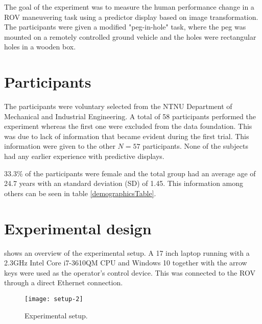 The goal of the experiment was to measure the human performance change in a ROV maneuvering task using a predictor display based on image transformation. The participants were given a modified "peg-in-hole" task, where the peg was mounted on a remotely controlled ground vehicle and the holes were rectangular holes in a wooden box.


\section{Participants}

The participants were voluntary selected from the NTNU Department of Mechanical and Industrial Engineering. A total of 58 participants performed the experiment whereas the first one were excluded from the data foundation. This was due to lack of information that became evident during the first trial. This information were given to the other $N=57$ participants. None of the subjects had any earlier experience with predictive displays.

33.3\% of the participants were female and the total group had an average age of 24.7 years with an standard deviation (SD) of 1.45. This information among others can be seen in table \ref{demographicsTable}.

\clearpage
\section{Experimental design}

 shows an overview of the experimental setup. A 17 inch laptop running with a 2.3GHz Intel Core i7-3610QM CPU and Windows 10 together with the arrow keys were used as the operator's control device. This was connected to the ROV through a direct Ethernet connection. 

\begin{figure}[h!]
    \centering
    \texttt{[image: setup-2]}
    \caption{Experimental setup.}
    \label{expsetup}
\end{figure}


